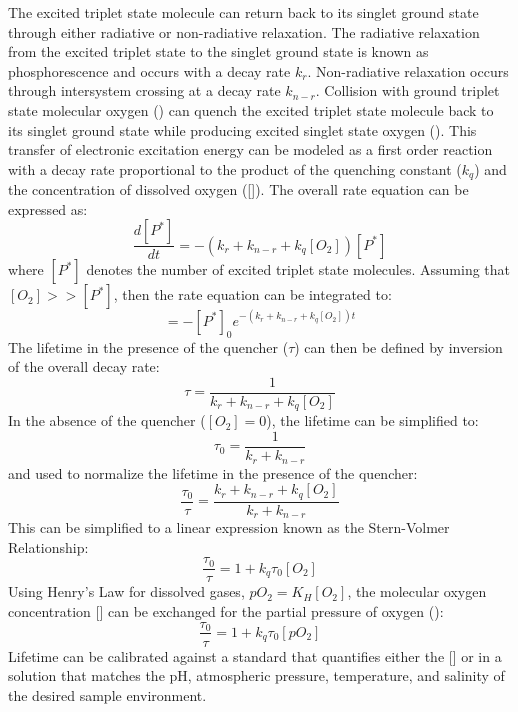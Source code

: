 The excited triplet state molecule can return back to its singlet ground state through either radiative or non-radiative relaxation. The radiative relaxation from the excited triplet state to the singlet ground state is known as phosphorescence and occurs with a decay rate $k_{r}$. Non-radiative relaxation occurs through intersystem crossing at a decay rate $k_{n-r}$. Collision with ground triplet state molecular oxygen () can quench the excited triplet state molecule back to its singlet ground state while producing excited singlet state oxygen (). This transfer of electronic excitation energy can be modeled as a first order reaction with a decay rate proportional to the product of the quenching constant ($k_{q}$) and the concentration of dissolved oxygen ([]).
%
The overall rate equation can be expressed as:
%
\begin{equation}
    \frac{d[P^*]}{dt} = -(k_{r} + k_{n-r} + k_{q}[O_{2}])[P^{*}]
\end{equation}
%
where $[P^{*}]$ denotes the number of excited triplet state molecules. Assuming that $[O_{2}] >> [P^{*}]$, then the rate equation can be integrated to:
%
\begin{equation}
    [P^*] = -[P^{*}]_{0}e^{-(k_{r} + k_{n-r} + k_{q}[O_{2}])t}
\end{equation}
%
The lifetime in the presence of the quencher ($\tau$) can then be defined by inversion of the overall decay rate:
%
\begin{equation}
    \tau = \frac{1}{k_{r} + k_{n-r} + k_{q}[O_{2}]}
\end{equation}
%
In the absence of the quencher ($[O_2] = 0$), the lifetime can be simplified to:
%
\begin{equation}
    \tau_{0} = \frac{1}{k_{r} + k_{n-r}}
\end{equation}
%
and used to normalize the lifetime in the presence of the quencher:
%
\begin{equation}
    \frac{\tau_{0}}{\tau} = \frac{k_{r} + k_{n-r} + k_{q}[O_{2}]}{k_{r} + k_{n-r}}
\end{equation}
%
This can be simplified to a linear expression known as the Stern-Volmer Relationship:
%
\begin{equation}
    \frac{\tau_{0}}{\tau} = 1 + k_{q}\tau_{0}[O_{2}]
\end{equation}
%
Using Henry's Law for dissolved gases, $pO_2 = K_H[O_2]$, the molecular oxygen concentration [] can be exchanged for the partial pressure of oxygen ():
%
\begin{equation}
    \frac{\tau_{0}}{\tau} = 1 + k_{q}\tau_{0}[pO_{2}]
\end{equation}
%
Lifetime can be calibrated against a standard that quantifies either the [] or  in a solution that matches the pH, atmospheric pressure, temperature, and salinity of the desired sample environment.



